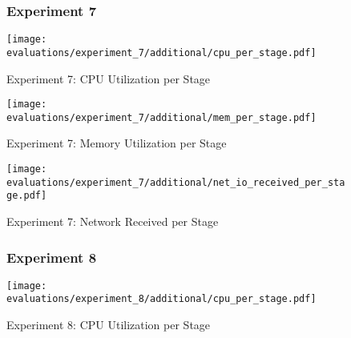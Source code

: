 \pagebreak

\begin{figure}[p]
    \subsubsection{Experiment 7}
    \begin{adjustwidth}{-0.2\paperwidth}{-0.2\paperwidth}
        \centering
        \texttt{[image: evaluations/experiment\_7/additional/cpu\_per\_stage.pdf]}
        \caption{Experiment 7: CPU Utilization per Stage}
        \label{fig:eval_7_cpu_per_stage}
    \end{adjustwidth}
\end{figure}

\begin{figure}[p]
    \begin{adjustwidth}{-0.2\paperwidth}{-0.2\paperwidth}
        \centering
        \texttt{[image: evaluations/experiment\_7/additional/mem\_per\_stage.pdf]}
        \caption{Experiment 7: Memory Utilization per Stage}
        \label{fig:eval_7_mem_per_stage}
    \end{adjustwidth}
\end{figure}

\begin{figure}[p]
    \begin{adjustwidth}{-0.2\paperwidth}{-0.2\paperwidth}
        \centering
        \texttt{[image: evaluations/experiment\_7/additional/net\_io\_received\_per\_stage.pdf]}
        \caption{Experiment 7: Network Received per Stage}
        \label{fig:eval_7_net_received_per_stage}
    \end{adjustwidth}
\end{figure}

\pagebreak

\begin{figure}[p]
    \subsubsection{Experiment 8}
    \begin{adjustwidth}{-0.2\paperwidth}{-0.2\paperwidth}
        \centering
        \texttt{[image: evaluations/experiment\_8/additional/cpu\_per\_stage.pdf]}
        \caption{Experiment 8: CPU Utilization per Stage}
        \label{fig:eval_8_cpu_per_stage}
    \end{adjustwidth}
\end{figure}

